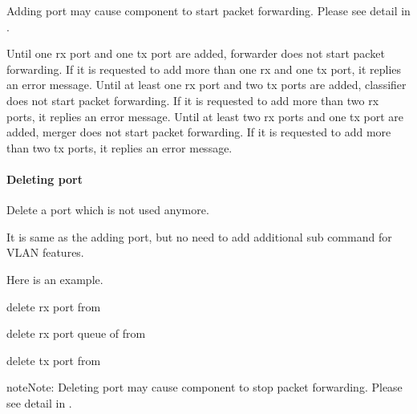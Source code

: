 \documentclass[a4paper,11pt,openany,oneside,english]{sphinxmanual}
\begin{document}
Adding port may cause component to start packet forwarding. Please see
detail in
{\hyperref[\detokenize{design/spp_secondary:spp-design-spp-sec-vf}]{}}.

Until one rx port and one tx port are added, forwarder does not start packet
forwarding. If it is requested to add more than one rx and one tx port, it
replies an error message.
Until at least one rx port and two tx ports are added, classifier does not
start packet forwarding. If it is requested to add more than two rx ports, it
replies an error message.
Until at least two rx ports and one tx port are added, merger does not start
packet forwarding. If it is requested to add more than two tx ports, it replies
an error message.


\paragraph{Deleting port}
\label{\detokenize{commands/secondary/spp_vf:deleting-port}}
Delete a port which is not used anymore.

\begin{sphinxVerbatim}[commandchars=\\\{\},formatcom=\footnotesize]
\end{sphinxVerbatim}

It is same as the adding port, but no need to add additional sub command
for VLAN features.

Here is an example.

\begin{sphinxVerbatim}[commandchars=\\\{\},formatcom=\footnotesize]
 delete rx port  from 

 delete rx port queue  of  from 

 delete tx port  from 
\end{sphinxVerbatim}

\begin{sphinxadmonition}{note}{Note:}
Deleting port may cause component to stop packet forwarding.
Please see detail in {\hyperref[\detokenize{design/spp_secondary:spp-design-spp-sec-vf}]{}}.
\end{sphinxadmonition}
\end{document}
